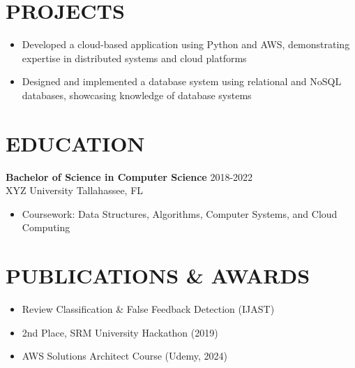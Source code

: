 \documentclass[letterpaper,10pt]{article}
\newcommand{\resumeItem}[1]{\item\small #1}
\newcommand{\resumeSubheading}[4]{
  \vspace{6pt}
  \noindent
  \textbf{#1} \hfill {\footnotesize #2} \\
  [-1pt]
  \noindent
  \small #3 \hfill {\small #4}
  \vspace{3pt}
}
\newcommand{\resumeItemsStart}{\vspace{-2pt}\begin{itemize}}
\newcommand{\resumeItemsEnd}{\end{itemize}\vspace{6pt}}
\begin{document}
\vspace{-8pt}


\section{\textcolor{metablue}{PROJECTS}}
\vspace{-5pt}
\begin{tcolorbox}[colback=white,colframe=metablue,boxrule=0.8pt,arc=2pt,left=4pt,right=4pt,top=2pt,bottom=2pt]
\begin{itemize}
\resumeItem{Developed a cloud-based application using Python and AWS, demonstrating expertise in distributed systems and cloud platforms}
\resumeItem{Designed and implemented a database system using relational and NoSQL databases, showcasing knowledge of database systems}
\end{itemize}
\end{tcolorbox}
\vspace{-5pt}


\section{\textcolor{metablue}{EDUCATION}}
\vspace{-10pt}

\resumeSubheading{Bachelor of Science in Computer Science}{2018-2022}{XYZ University}{Tallahassee, FL}
\resumeItemsStart
\resumeItem{Coursework: Data Structures, Algorithms, Computer Systems, and Cloud Computing}
\resumeItemsEnd

\vspace{-10pt}

\section{\textcolor{metablue}{PUBLICATIONS \& AWARDS}}
\vspace{-5pt}
\begin{itemize}
\resumeItem{Review Classification \& False Feedback Detection (IJAST)}
\resumeItem{2nd Place, SRM University Hackathon (2019)}
\resumeItem{AWS Solutions Architect Course (Udemy, 2024)}
\end{itemize}
\end{document}
